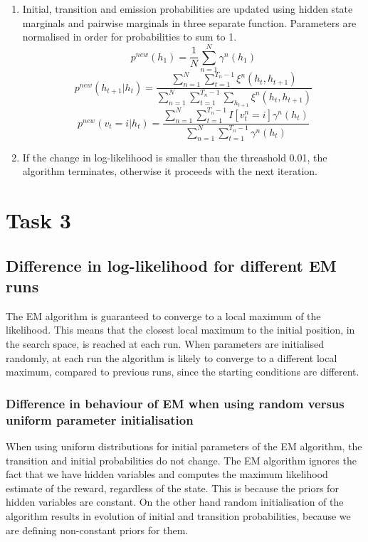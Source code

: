 \documentclass[a4paper, 11pt]{article}
\begin{document}
\begin{enumerate}
\item Initial, transition and emission probabilities are updated using hidden state marginals and pairwise marginals in three separate function. Parameters are normalised in order for probabilities to sum to 1.
\begin{equation}
p^{new}(h_1) = \frac{1}{N}\sum\limits_{n=1}^N \gamma^n(h_1) 
\end{equation}
\begin{equation}
p^{new}(h_{t+1}|h_t) = \frac{\sum\limits_{n=1}^N \sum\limits_{t=1}^{T_n-1}\xi^n(h_t,h_{t+1})}
{ \sum\limits_{n=1}^N \sum\limits_{t=1}^{T_n-1} \sum\limits_{h_{t+1}} \xi^n(h_t,h_{t+1})}
\end{equation}
\begin{equation}
p^{new}(v_t=i|h_t) = \frac{\sum\limits_{n=1}^N \sum\limits_{t=1}^{T_n-1}  I[v_t^n = i] \gamma^n(h_t)}
{ \sum\limits_{n=1}^N \sum\limits_{t=1}^{T_n-1} \gamma^n(h_t)} 
\end{equation}



\item If the change in log-likelihood is smaller than the threashold 0.01, the algorithm terminates, otherwise it proceeds with the next iteration.
\end{enumerate}


\section{Task 3}
\subsection{Difference in log-likelihood for different EM runs}
The EM algorithm is guaranteed to converge to a local maximum of the likelihood. This means that the closest local maximum to the initial position, in the search space, is reached at each run.  When parameters are initialised randomly, at each run the algorithm is likely to converge to a different local maximum, compared to previous runs, since the starting conditions are different.

\subsubsection{Difference in behaviour of EM when using random versus uniform parameter initialisation}
When using uniform distributions for initial parameters of the EM algorithm, the transition and initial probabilities do not change. The EM algorithm ignores the fact that we have hidden variables and computes the maximum likelihood estimate of the reward, regardless of the state. This is because the priors for hidden variables are constant.
On the other hand random initialisation of the algorithm results in evolution of initial and transition probabilities, because we are defining non-constant priors for them.  
\end{document}

